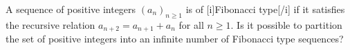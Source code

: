 A sequence of positive integers $(a_n)_{n \ge 1}$ is of [i]Fibonacci type[/i] if it satisfies the recursive relation $a_{n + 2} = a_{n + 1} + a_n$ for all $n \ge 1$. Is it possible to partition the set of positive integers into an infinite number of Fibonacci type sequences?